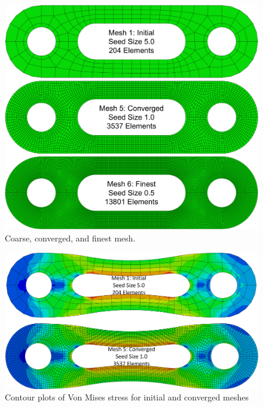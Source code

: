 \documentclass[../main.tex]{subfiles}
\begin{document}
\begin{figure}[h!]
    \centering
    \includegraphics[scale=0.6]{../../images/meshes.png}
    \caption{Coarse, converged, and finest mesh.}
    \label{meshes}
\end{figure}

\begin{figure}[h!]
    \centering
    \includegraphics[scale=0.5]{../../images/coarse_vs_converged.png}
    \caption{Contour plots of Von Mises stress for initial and converged meshes}
    \label{coarse_vs_converged}
\end{figure}
\end{document}

